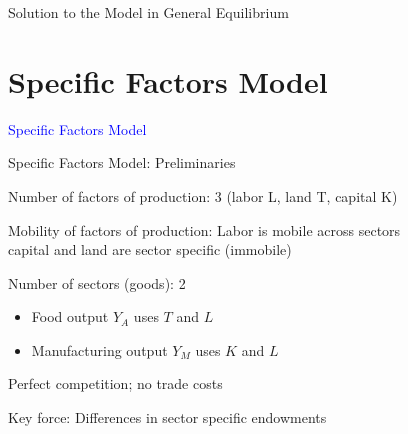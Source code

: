 \documentclass[notes,11pt, aspectratio=169, xcolor=table]{beamer}
\newcommand{\blue}[1]{\textcolor{blue}{#1}}
\newenvironment{wideitemize}{\itemize\addtolength{\itemsep}{10pt}}{\enditemize}
\begin{document}
\begin{frame}{Solution to the Model in General Equilibrium}
\begin{figure}[htbp!]
\begin{subfigure}{}
{
}

\end{subfigure}

\end{figure}
\end{frame}

\section{Specific Factors Model}

\begin{frame}
\addtocounter{framenumber}{-1}

\centering

\Huge{\blue{Specific Factors Model}}
    
\end{frame}

\begin{frame}{Specific Factors Model: Preliminaries}
    \begin{wideitemize}
        \item Number of factors of production: 3 (labor L, land T, capital K)
        
    \item Mobility of factors of production: Labor is mobile across sectors \\
    capital and land are sector specific (immobile)

    \item Number of sectors (goods): 2 
    \begin{itemize}
        \item Food output $Y_A$ uses $T$ and $L$
        \item Manufacturing output $Y_M$ uses $K$ and $L$
    \end{itemize}

    \item Perfect competition; no trade costs

    \item Key force: Differences in sector specific endowments
    \end{wideitemize}    
\end{frame}
\end{document}
